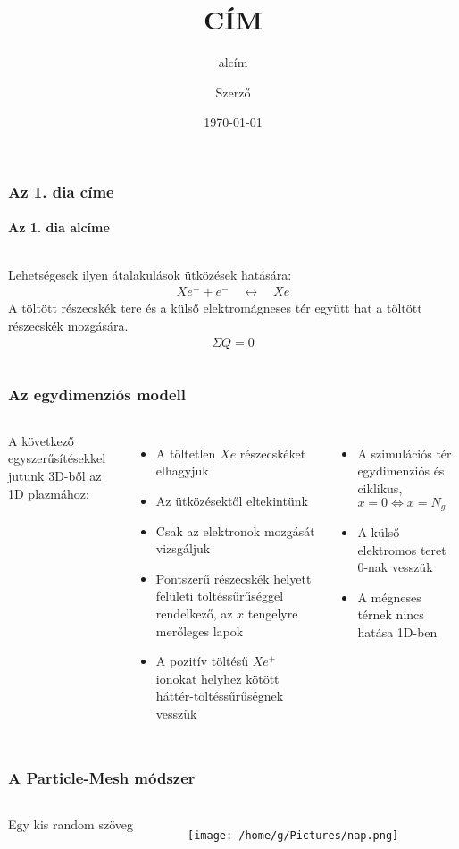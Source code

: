 \documentclass{beamer}
\title{CÍM}			%
\subtitle{alcím} 	%
\date{\today}
\author{Szerző}	%
\institute{Institute} %
\begin{document}
\maketitle	%

\begin{frame}
	\frametitle{Az 1. dia címe}
	\framesubtitle{Az 1. dia alcíme}
	\begin{columns}	
			\blindtext
			Lehetségesek ilyen átalakulások ütközések hatására:
			\begin{align*}
				Xe^+ + e^- \quad \longleftrightarrow \quad Xe
			\end{align*}		
			A töltött részecskék tere és a külső elektromágneses tér együtt hat a töltött részecskék mozgására.
			\begin{align*}
				\Sigma Q = 0
			\end{align*}
	\end{columns}
\end{frame}

\begin{frame}
	\frametitle{Az egydimenziós modell}
	\begin{columns}
		\column{0.48\textwidth}
			A következő egyszerűsítésekkel jutunk 3D-ből az 1D plazmához: \\
			\begin{itemize}
				\item A töltetlen $Xe$ részecskéket elhagyjuk
				\item Az ütközésektől eltekintünk
				\item Csak az elektronok mozgását vizsgáljuk
				\item Pontszerű részecskék helyett felületi töltéssűrűséggel rendelkező, az $x$ tengelyre merőleges lapok
				\item A pozitív töltésű $Xe^+$ ionokat helyhez kötött háttér-töltéssűrűségnek vesszük
			\end{itemize}
		\column{0.48\textwidth}
			\begin{itemize}
				\item A szimulációs tér egydimenziós és ciklikus, $x=0 \Longleftrightarrow x=N_g$
				\item A külső elektromos teret 0-nak vesszük
				\item A mégneses térnek nincs hatása 1D-ben
			\end{itemize}
	\end{columns}
\end{frame}

\begin{frame}
	\frametitle{A Particle-Mesh módszer}
	\begin{columns}
			Egy kis random szöveg
			\begin{figure}
				\texttt{[image: /home/g/Pictures/nap.png]}
			\end{figure}
	\end{columns}
\end{frame}
\end{document}
